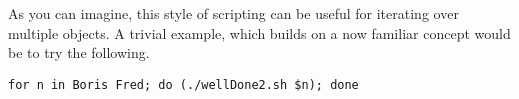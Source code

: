 \begin{advanced}
As you can imagine, this style of scripting can be useful for iterating over multiple objects.
A trivial example, which builds on a now familiar concept would be to try the following.
\begin{lstlisting}
for n in Boris Fred; do (./wellDone2.sh $n); done
\end{lstlisting}
\end{advanced}

%
%
%
%
%
%
%
